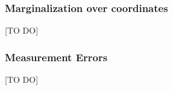 

\subsubsection{Marginalization over coordinates}
[TO DO]

\subsubsection{Measurement Errors}

[TO DO]
